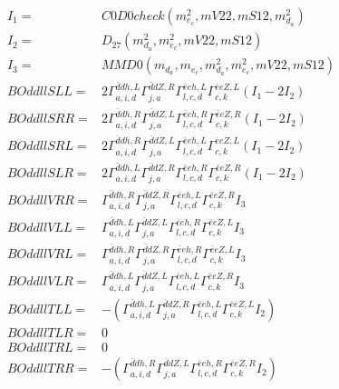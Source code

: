 \documentclass[A4,landscape]{article}
\begin{document}
\begin{align} 
I_1 = & C0D0check(m^2_{e_{{c}}}, mV22, mS12, m^2_{d_{{a}}}) \\ 
I_2 = & D_{27}(m^2_{d_{{a}}}, m^2_{e_{{c}}}, mV22, mS12) \\ 
I_3 = & MMD0(m_{d_{{a}}}, m_{e_{{c}}}, m^2_{d_{{a}}}, m^2_{e_{{c}}}, mV22, mS12) \\ 
  BOddllSLL= & 2  \Gamma^{\bar{d}d h ,L}_{a, i, d} \Gamma^{\bar{d}d Z ,R}_{j, a} \Gamma^{\bar{e}e h ,L}_{l, c, d} \Gamma^{\bar{e}e Z ,L}_{c, k} (I_1 - 2 I_2) \\ 
  BOddllSRR= & 2  \Gamma^{\bar{d}d h ,R}_{a, i, d} \Gamma^{\bar{d}d Z ,L}_{j, a} \Gamma^{\bar{e}e h ,R}_{l, c, d} \Gamma^{\bar{e}e Z ,R}_{c, k} (I_1 - 2 I_2) \\ 
  BOddllSRL= & 2  \Gamma^{\bar{d}d h ,R}_{a, i, d} \Gamma^{\bar{d}d Z ,L}_{j, a} \Gamma^{\bar{e}e h ,L}_{l, c, d} \Gamma^{\bar{e}e Z ,L}_{c, k} (I_1 - 2 I_2) \\ 
  BOddllSLR= & 2  \Gamma^{\bar{d}d h ,L}_{a, i, d} \Gamma^{\bar{d}d Z ,R}_{j, a} \Gamma^{\bar{e}e h ,R}_{l, c, d} \Gamma^{\bar{e}e Z ,R}_{c, k} (I_1 - 2 I_2) \\ 
  BOddllVRR= &  \Gamma^{\bar{d}d h ,R}_{a, i, d} \Gamma^{\bar{d}d Z ,R}_{j, a} \Gamma^{\bar{e}e h ,L}_{l, c, d} \Gamma^{\bar{e}e Z ,R}_{c, k} I_3 \\ 
  BOddllVLL= &  \Gamma^{\bar{d}d h ,L}_{a, i, d} \Gamma^{\bar{d}d Z ,L}_{j, a} \Gamma^{\bar{e}e h ,R}_{l, c, d} \Gamma^{\bar{e}e Z ,L}_{c, k} I_3 \\ 
  BOddllVRL= &  \Gamma^{\bar{d}d h ,R}_{a, i, d} \Gamma^{\bar{d}d Z ,R}_{j, a} \Gamma^{\bar{e}e h ,R}_{l, c, d} \Gamma^{\bar{e}e Z ,L}_{c, k} I_3 \\ 
  BOddllVLR= &  \Gamma^{\bar{d}d h ,L}_{a, i, d} \Gamma^{\bar{d}d Z ,L}_{j, a} \Gamma^{\bar{e}e h ,L}_{l, c, d} \Gamma^{\bar{e}e Z ,R}_{c, k} I_3 \\ 
  BOddllTLL= & -( \Gamma^{\bar{d}d h ,L}_{a, i, d} \Gamma^{\bar{d}d Z ,R}_{j, a} \Gamma^{\bar{e}e h ,L}_{l, c, d} \Gamma^{\bar{e}e Z ,L}_{c, k} I_2) \\ 
  BOddllTLR= & 0 \\ 
  BOddllTRL= & 0 \\ 
  BOddllTRR= & -( \Gamma^{\bar{d}d h ,R}_{a, i, d} \Gamma^{\bar{d}d Z ,L}_{j, a} \Gamma^{\bar{e}e h ,R}_{l, c, d} \Gamma^{\bar{e}e Z ,R}_{c, k} I_2) \\ 
\end{align} 
\end{document}
